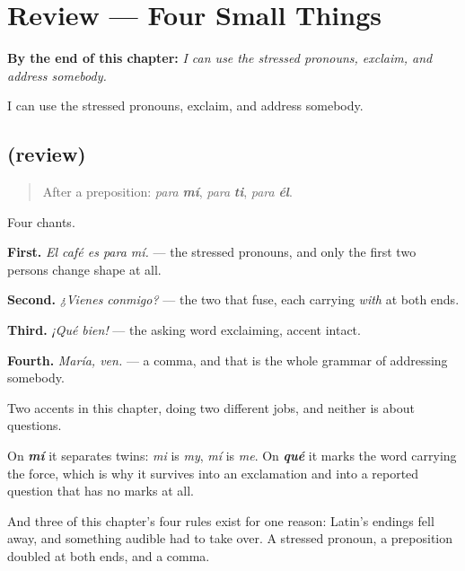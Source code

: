 
\chapter{Review --- Four Small Things}
\label{ch:repaso-tonicos}

\begin{chapteropening}
\textbf{By the end of this chapter:} \emph{I can use the stressed pronouns, exclaim, and address somebody.}

I can use the stressed pronouns, exclaim, and address somebody.
\end{chapteropening}

\section[(review)]{(review)}

\label{lesson:ES-C64-repaso-tonicos}



\begin{quote}
After a preposition: \emph{para} \emph{\textbf{mí}}, \emph{para} \emph{\textbf{ti}}, \emph{para} \emph{\textbf{él}}.
\end{quote}

\begin{grammarlens}[title={What you've built}]
Four chants.

\textbf{First.} \emph{El café es para mí.} — the stressed pronouns, and only the first two persons change shape at all.

\textbf{Second.} \emph{¿Vienes conmigo?} — the two that fuse, each carrying \emph{with} at both ends.

\textbf{Third.} \emph{¡Qué bien!} — the asking word exclaiming, accent intact.

\textbf{Fourth.} \emph{María, ven.} — a comma, and that is the whole grammar of addressing somebody.
\end{grammarlens}

\begin{grammarlens}[title={Grammar Lens: the accent has never been about questions}]
Two accents in this chapter, doing two different jobs, and neither is about questions.

On \emph{\textbf{mí}} it separates twins: \emph{mi} is \emph{my}, \emph{mí} is \emph{me}. On \emph{\textbf{qué}} it marks the word carrying the force, which is why it survives into an exclamation and into a reported question that has no marks at all.

And three of this chapter's four rules exist for one reason: Latin's endings fell away, and something audible had to take over. A stressed pronoun, a preposition doubled at both ends, and a comma.
\end{grammarlens}


